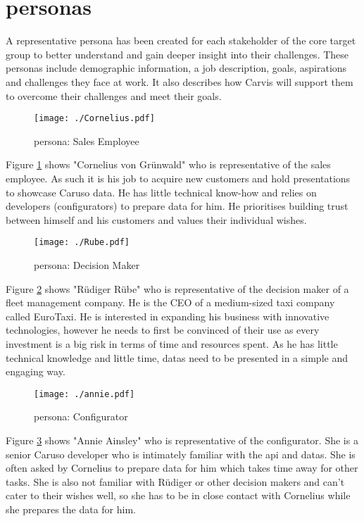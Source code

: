 \section{\Glspl{persona}}
A representative \gls{persona} has been created for each \gls{stakeholder} of the core target group to better understand and gain deeper insight into their challenges. These \glspl{persona} include demographic information, a job description, goals, aspirations and challenges they face at work. It also describes how Carvis will support them to overcome their challenges and meet their goals.

\begin{figure}[ht]
  \centering
  \texttt{[image: ./Cornelius.pdf]}
  \caption{\Gls{persona}: Sales Employee }
  \label{Persona:Cornelius}
\end{figure}
Figure \ref{Persona:Cornelius} shows "Cornelius von Grünwald" who is representative of the sales employee. As such it is his job to acquire new customers and hold presentations to showcase Caruso data. He has little technical know-how and relies on developers (configurators) to prepare data for him. He prioritises building trust between himself and his customers and values their individual wishes.

\begin{figure}[ht]
  \centering
  \texttt{[image: ./Rube.pdf]}
  \caption{\Gls{persona}: Decision Maker}
  \label{Persona:Rube}
\end{figure}
Figure \ref{Persona:Rube} shows "Rüdiger Rübe" who is representative of the decision maker of a fleet management company. He is the CEO of a medium-sized taxi company called EuroTaxi. He is interested in expanding his business with innovative technologies, however he needs to first be convinced of their use as every investment is a big risk in terms of time and resources spent. As he  has little technical knowledge and little time, \glspl{data} need to be presented in a simple and engaging way. 

\begin{figure}[ht]
  \centering
  \texttt{[image: ./annie.pdf]}
  \caption{\Gls{persona}: Configurator}
  \label{Persona:Annie}
\end{figure}
Figure \ref{Persona:Annie} shows "Annie Ainsley" who is representative of the configurator. She is a senior Caruso developer who is intimately familiar with the \gls{api} and \glspl{data}. She is often asked by Cornelius to prepare data for him which takes time away for other tasks. She is also not familiar with Rüdiger or other decision makers and can't cater to their wishes well, so she has to be in close contact with Cornelius while she prepares the data for him.